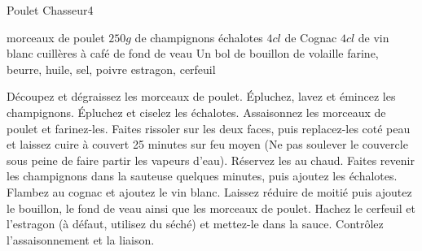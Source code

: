 \begin{recette}{Poulet Chasseur}{4}{}{}
\begin{ingredients}
 morceaux de poulet
\ingredient $250\unit{g}$ de champignons
 échalotes
\ingredient $4\unit{cl}$ de Cognac
\ingredient $4\unit{cl}$ de vin blanc
 cuillères à café de fond de veau
\ingredient Un bol de bouillon de volaille
\ingredient farine, beurre, huile, sel, poivre
\ingredient estragon, cerfeuil
\end{ingredients}



\begin{preparation}
\etape Découpez et dégraissez les morceaux de poulet. Épluchez, lavez et émincez les champignons. Épluchez et ciselez les échalotes.
\etape Assaisonnez les morceaux de poulet et farinez-les. Faites rissoler sur les deux faces, puis replacez-les coté peau et laissez cuire à couvert 25 minutes sur feu moyen (Ne pas soulever le couvercle sous peine de faire partir les vapeurs d'eau).
\etape Réservez les au chaud. Faites revenir les champignons dans la sauteuse quelques minutes, puis ajoutez les échalotes. Flambez au cognac et ajoutez le vin blanc. Laissez réduire de moitié puis ajoutez le bouillon, le fond de veau ainsi que les morceaux de poulet.
\etape  Hachez le cerfeuil et l'estragon (à défaut, utilisez du séché) et mettez-le dans la sauce. Contrôlez l'assaisonnement et la liaison.
\end{preparation}

\end{recette}

